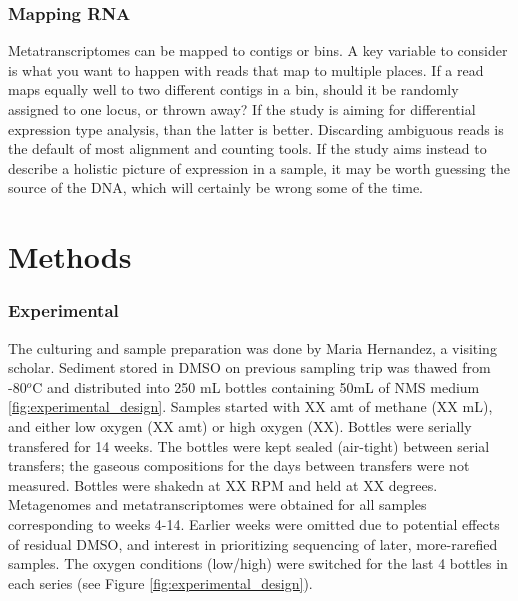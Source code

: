 \subsubsection{Mapping RNA}
Metatranscriptomes can be mapped to contigs or bins.
A key variable to consider is what you want to happen with reads that map to multiple places.
If a read maps equally well to two different contigs in a bin, should it be randomly assigned to one locus, or thrown away?
If the study is aiming for differential expression type analysis, than the latter is better.
Discarding ambiguous reads is the default of most alignment and counting tools.
If the study aims instead to describe a holistic picture of expression in a sample, it may be worth guessing the source of the DNA, which will certainly be wrong some of the time.


\section{Methods}

\subsubsection{Experimental}  %
The culturing and sample preparation was done by Maria Hernandez, a visiting scholar.
Sediment stored in DMSO on previous sampling trip was thawed from -80$^o$C and distributed into 250 mL bottles containing 50mL of NMS medium \ref{fig:experimental_design}.
Samples started with XX amt of methane (XX mL), and either low oxygen (XX amt) or high oxygen (XX).
Bottles were serially transfered for 14 weeks.
The bottles were kept sealed (air-tight) between serial transfers; the gaseous compositions for the days between transfers were not measured.
Bottles were shakedn at XX RPM and held at XX degrees.
Metagenomes and metatranscriptomes were obtained for all samples corresponding to weeks 4-14.
Earlier weeks were omitted due to potential effects of residual DMSO, and interest in prioritizing sequencing of later, more-rarefied samples.
The oxygen conditions (low/high) were switched for the last 4 bottles in each series (see Figure \ref{fig:experimental_design}).

